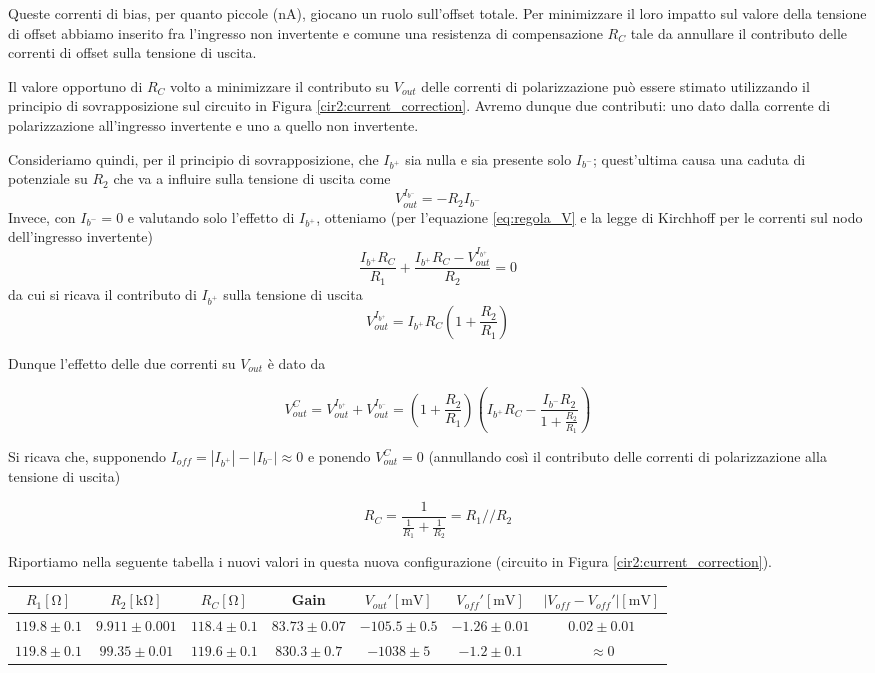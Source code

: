 Queste correnti di bias, per quanto piccole (\si{\nano\ampere}), giocano un ruolo sull'offset totale. Per minimizzare il loro impatto sul valore della tensione di offset abbiamo inserito fra l'ingresso non invertente e comune una resistenza di compensazione $R_C$ tale da annullare il contributo delle correnti di offset sulla tensione di uscita.

Il valore opportuno di $R_C$ volto a minimizzare il contributo su $V_{out}$ delle correnti di polarizzazione può essere stimato utilizzando il principio di sovrapposizione sul circuito in Figura \ref{cir2:current_correction}. Avremo dunque due contributi: uno dato dalla corrente di polarizzazione all'ingresso invertente e uno a quello non invertente.

Consideriamo quindi, per il principio di sovrapposizione, che $I_{b^+}$ sia nulla e sia presente solo  $I_{b^-}$; quest'ultima causa una caduta di potenziale su $R_2$ che va a influire sulla tensione di uscita come
$$V_{out}^{I_{b^-}}=-R_2 I_{b^-}$$
Invece, con $ I_{b^-}=0$ e valutando solo l'effetto di $I_{b^+}$, otteniamo (per l'equazione \ref{eq:regola_V} e la legge di Kirchhoff per le correnti sul nodo dell'ingresso invertente)
$$\frac{I_{b^+}R_C}{R_1}+\frac{I_{b^+}R_C-V_{out}^{I_{b^+}}}{R_2}=0$$
da cui si ricava il contributo di $I_{b^+}$ sulla tensione di uscita
$$V_{out}^{I_{b^+}}=I_{b^+} R_C \left( 1+ \frac{R_2}{R_1}\right)$$

Dunque l'effetto delle due correnti su $V_{out}$ è dato da

\begin{equation}
V_{out}^{C} = V_{out}^{I_{b^+}} + V_{out}^{I_{b^-}}= \left( 1+\frac{R_2}{R_1} \right)\left( I_{b^+} R_C - \frac{I_{b^-}R_2}{1+\frac{R_2}{R_1}}\right)
\label{eq2:Vout_currents}
\end{equation}

Si ricava che, supponendo $I_{off} = |I_{b^+}|-|I_{b^-}| \approx 0$ e ponendo $V_{out}^{C}=0$ (annullando così il contributo delle correnti di polarizzazione alla tensione di uscita)

\begin{equation}
R_C=\frac{1}{\frac{1}{R_1} + \frac{1}{R_2}} = R_1 // R_2
\label{eq2:R_C}
\end{equation}

Riportiamo nella seguente tabella i nuovi valori in questa nuova configurazione (circuito in Figura \ref{cir2:current_correction}).

\begin{center}
\begin{tabular}{c|c|c|c|c|c|c}
$R_1[\si{\ohm}]$ & $R_2[\si{\kilo\ohm}]$ & $R_C [\si{\ohm}]$ & Gain & $V_{out}' [\si{\milli\volt}]$ & $V_{off}' [\si{\milli\volt}]$ & $|V_{off}-V_{off}'|[\si{\milli\volt}]$ \\ 
\hline 
 $119.8\pm0.1$ & $9.911\pm0.001$  & $118.4\pm0.1$ & $83.73 \pm 0.07$ & $-105.5 \pm 0.5$ & $-1.26 \pm0.01$ & $0.02\pm0.01$ \\
\hline
$119.8\pm0.1$ & $99.35\pm0.01$  &$119.6\pm0.1$ & $830.3\pm0.7$ &$ -1038 \pm 5$ & $-1.2 \pm 0.1$ & $\approx 0$\\
\end{tabular}
\end{center}

